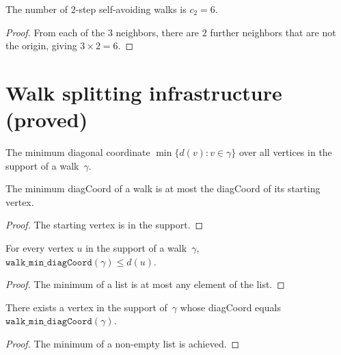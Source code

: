 \begin{lemma}
\begin{enumerate}
\begin{lemma}[SAW count $c_2 = 6$]\label{lem:c2}
\leanok
{}
  The number of $2$-step self-avoiding walks is $c_2 = 6$.
\end{lemma}
\begin{proof}\leanok
  From each of the $3$ neighbors, there are $2$ further neighbors
  that are not the origin, giving $3 \times 2 = 6$.
\end{proof}

\section{Walk splitting infrastructure (proved)}\label{sec:walk-split}

\begin{definition}\label{def:walk-min-diag}
\leanok
{}
  The minimum diagonal coordinate $\min\{d(v) : v \in \gamma\}$
  over all vertices in the support of a walk~$\gamma$.
\end{definition}

\begin{lemma}\label{lem:min-diag-start}
\leanok
{}
  The minimum diagCoord of a walk is at most the diagCoord of its starting vertex.
\end{lemma}
\begin{proof}\leanok
  The starting vertex is in the support.
\end{proof}

\begin{lemma}\label{lem:min-diag-bound}
\leanok
{}
  For every vertex $u$ in the support of a walk~$\gamma$,
  $\texttt{walk\_min\_diagCoord}(\gamma) \leq d(u)$.
\end{lemma}
\begin{proof}\leanok
  The minimum of a list is at most any element of the list.
\end{proof}

\begin{lemma}\label{lem:min-diag-achieved}
\leanok
{}
  There exists a vertex in the support of~$\gamma$ whose diagCoord
  equals $\texttt{walk\_min\_diagCoord}(\gamma)$.
\end{lemma}
\begin{proof}\leanok
  The minimum of a non-empty list is achieved.
\end{proof}


\end{enumerate}
\end{lemma}
